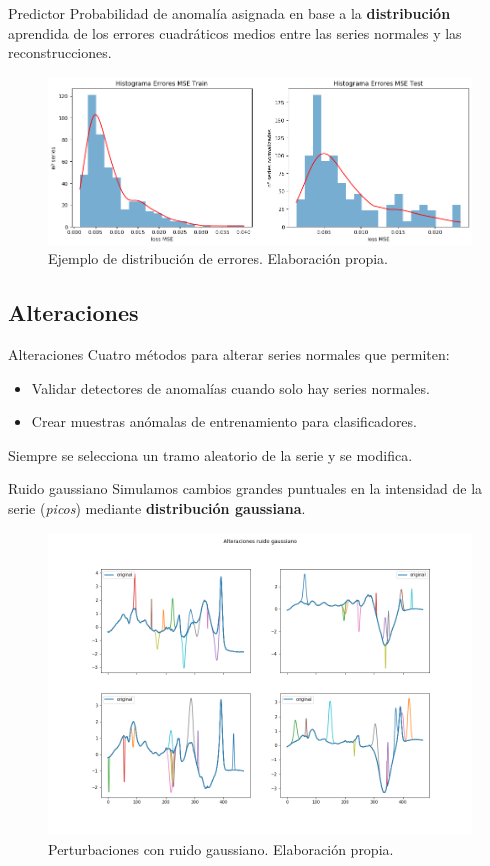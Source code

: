 \documentclass[spanish]{beamer}
\begin{document}
\begin{frame}{Predictor}
  Probabilidad de anomalía asignada en base a la \textbf{distribución} aprendida de los errores cuadráticos medios entre las series normales y las reconstrucciones.

  \begin{figure}
    \centering
    \includegraphics[width=1\linewidth]{img/hists}
    \caption{Ejemplo de distribución de errores. Elaboración propia.}
  \end{figure}
\end{frame}

\subsection{Alteraciones}

\begin{frame}{Alteraciones}
  Cuatro métodos para alterar series normales que permiten:
  \begin{itemize}
    \item Validar detectores de anomalías cuando solo hay series normales.
    \item Crear muestras anómalas de entrenamiento para clasificadores.
  \end{itemize}
  \pause

  Siempre se selecciona un tramo aleatorio de la serie y se modifica.
\end{frame}

\begin{frame}{Ruido gaussiano}
  Simulamos cambios grandes puntuales en la intensidad de la serie (\emph{picos}) mediante \textbf{distribución gaussiana}.

  \begin{figure}
    \centering
    \includegraphics[width=.8\linewidth]{img/ruido-gauss}
    \caption{Perturbaciones con ruido gaussiano. Elaboración propia.}
  \end{figure}
\end{frame}
\end{document}
